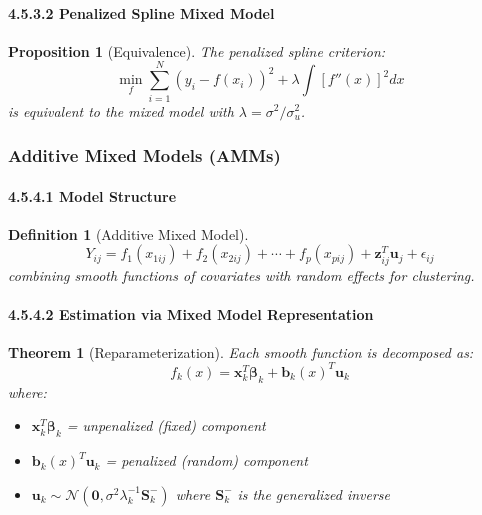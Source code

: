 \documentclass{article}
\newtheorem{definition}{Definition}
\newtheorem{theorem}{Theorem}
\newtheorem{proposition}{Proposition}
\begin{document}
\paragraph{4.5.3.2 Penalized Spline Mixed Model}

\begin{proposition}[Equivalence]
The penalized spline criterion:
\begin{equation}
\min_f \sum_{i=1}^N (y_i - f(x_i))^2 + \lambda \int [f''(x)]^2 dx
\end{equation}
is equivalent to the mixed model with $\lambda = \sigma^2/\sigma_u^2$.
\end{proposition}

\subsubsection{Additive Mixed Models (AMMs)}

\paragraph{4.5.4.1 Model Structure}

\begin{definition}[Additive Mixed Model]
\begin{equation}
Y_{ij} = f_1(x_{1ij}) + f_2(x_{2ij}) + \cdots + f_p(x_{pij}) + \mathbf{z}_{ij}^T\mathbf{u}_j + \epsilon_{ij}
\end{equation}
combining smooth functions of covariates with random effects for clustering.
\end{definition}

\paragraph{4.5.4.2 Estimation via Mixed Model Representation}

\begin{theorem}[Reparameterization]
Each smooth function is decomposed as:
\begin{equation}
f_k(x) = \mathbf{x}_k^T\boldsymbol{\beta}_k + \mathbf{b}_k(x)^T\mathbf{u}_k
\end{equation}
where:
\begin{itemize}
    \item $\mathbf{x}_k^T\boldsymbol{\beta}_k$ = unpenalized (fixed) component
    \item $\mathbf{b}_k(x)^T\mathbf{u}_k$ = penalized (random) component
    \item $\mathbf{u}_k \sim \mathcal{N}(\mathbf{0}, \sigma^2\lambda_k^{-1}\mathbf{S}_k^{-})$ where $\mathbf{S}_k^{-}$ is the generalized inverse
\end{itemize}
\end{theorem}
\end{document}
